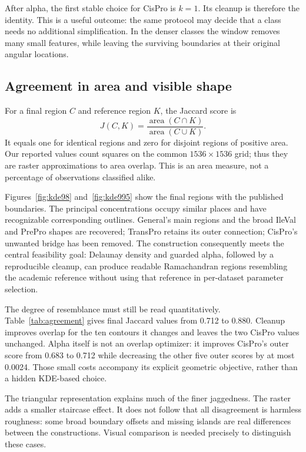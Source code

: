 \documentclass[11pt]{article}
\newcommand{\area}{\operatorname{area}}
\begin{document}
After alpha, the first stable choice for CisPro is $k=1$. Its cleanup is
therefore the identity. This is a useful outcome: the same protocol may
decide that a class needs no additional simplification. In the denser
classes the window removes many small features, while leaving the
surviving boundaries at their original angular locations.

\subsection{Agreement in area and visible shape}

For a final region $C$ and reference region $K$, the Jaccard score is
\begin{equation}
 J(C,K)=\frac{\area(C\cap K)}{\area(C\cup K)}.
 \label{eq:jaccard}
\end{equation}
It equals one for identical regions and zero for disjoint regions of
positive area. Our reported values count squares on the common
$1536\times1536$ grid; thus they are raster approximations to area overlap.
This is an area measure, not a percentage of observations classified alike.

Figures~\ref{fig:kde98} and~\ref{fig:kde995} show the final regions with the
published boundaries. The principal concentrations occupy similar places
and have recognizable corresponding outlines. General's main regions and
the broad IleVal and PrePro shapes are recovered; TransPro retains its
outer connection; CisPro's unwanted bridge has been removed. The
construction consequently meets the central feasibility goal: Delaunay
density and guarded alpha, followed by a reproducible cleanup, can produce
readable Ramachandran regions resembling the academic reference without
using that reference in per-dataset parameter selection.

The degree of resemblance must still be read quantitatively.
Table~\ref{tab:agreement} gives final Jaccard values from 0.712 to 0.880.
Cleanup improves overlap for the ten contours it changes and leaves the
two CisPro values unchanged. Alpha itself is not an overlap optimizer:
it improves CisPro's outer score from 0.683 to 0.712 while decreasing the
other five outer scores by at most 0.0024. Those small costs accompany its
explicit geometric objective, rather than a hidden KDE-based choice.

The triangular representation explains much of the finer jaggedness.
The raster adds a smaller staircase effect. It does not follow that all
disagreement is harmless roughness: some broad boundary offsets and missing
islands are real differences between the constructions. Visual comparison
is needed precisely to distinguish these cases.
\end{document}
